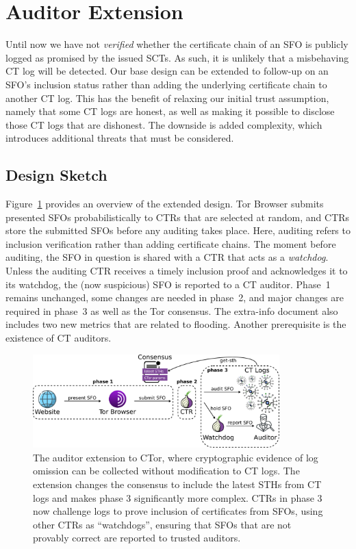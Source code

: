 \section{Auditor Extension} \label{sec:auditor}
Until now we have not \emph{verified} whether the certificate chain of an SFO is
publicly logged as promised by the issued SCTs.  As such, it is unlikely that a
misbehaving CT log will be detected.
Our base design can be extended to follow-up
on an SFO's inclusion status rather than adding the underlying certificate chain
to another CT log.  This has the benefit of relaxing our initial trust
assumption, namely that some CT logs are honest, as well as making it possible
to disclose those CT logs that are dishonest.  The downside is added
complexity, which introduces additional threats that must be considered.

\subsection{Design Sketch} \label{sec:auditor:design}
Figure~\ref{fig:auditor} provides an overview of the extended design.  Tor
Browser submits presented SFOs probabilistically to CTRs that are selected at
random, and CTRs store the submitted SFOs before any auditing takes place.
Here, auditing refers to inclusion verification rather than adding certificate
chains.  The moment before auditing, the SFO in question is shared with a CTR
that acts as a \emph{watchdog}.  Unless the auditing CTR receives a timely
inclusion proof and acknowledges it to its watchdog, the (now suspicious) SFO is
reported to a CT auditor.  Phase~1 remains unchanged, some changes are needed
in phase~2, and major changes are required in phase~3 as well as the Tor
consensus.  The extra-info document also includes two new metrics that are
related to flooding.  Another prerequisite is the existence of CT auditors.

\begin{figure}
    \centering
    \includegraphics[width=0.85\textwidth]{img/design-auditor}
	\caption{The auditor extension to CTor, where cryptographic evidence of log
	omission can be collected without modification to CT logs. The extension
	changes the consensus to include the latest STHs from CT logs and makes
	phase 3 significantly more complex. CTRs in phase 3 now challenge logs to
	prove inclusion of certificates from SFOs, using other CTRs as
	``watchdogs'', ensuring that SFOs that are not provably correct are reported
	to trusted auditors.}
	\label{fig:auditor}
\end{figure}

